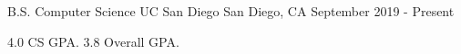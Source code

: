 
\begin{cventries}
  \cventry
    {B.S. Computer Science}
    {UC San Diego}
    {San Diego, CA}
    {September 2019 - Present}
    {
      \begin{cvitems}
        \item {4.0 CS GPA. 3.8 Overall GPA.}
      \end{cvitems}
    }
\end{cventries}
